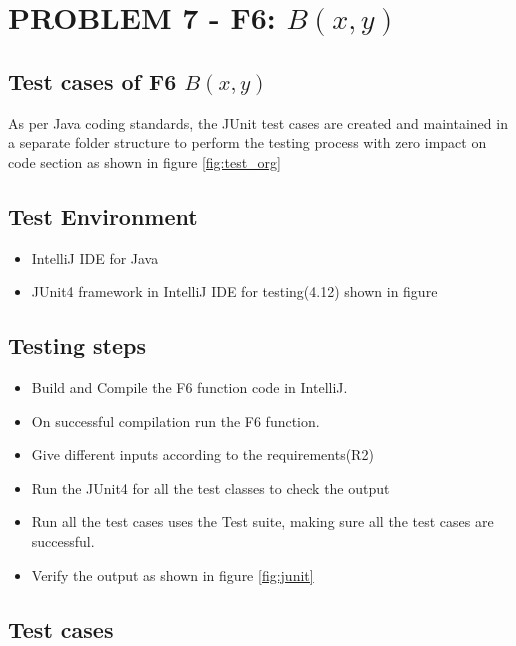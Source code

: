 \documentclass[letterpaper, 11pt]{article}
\begin{document}
\section{{PROBLEM 7 - F6: $B(x,y)$}}
    \subsection{Test cases of F6 $B(x,y)$}
    As per Java coding standards, the JUnit test cases are created and maintained in a separate folder structure to perform the testing process with zero impact on code section as shown in figure \ref{fig:test_org} \\
    \subsection{Test Environment}
        \begin{itemize}
            \item IntelliJ IDE for Java
            \item  JUnit4 framework in IntelliJ IDE for
            testing(4.12) shown in figure 
        \end{itemize}

    \subsection{Testing steps}
        \begin{itemize}
            \item Build and Compile the F6 function code in IntelliJ.
            \item On successful compilation run the F6 function.
            \item Give different inputs according to the requirements(R2)
            \item Run the JUnit4 for all the test classes to check the output
            \item Run all the test cases uses the Test suite, making sure all the test cases are successful.
            \item Verify the output as shown in figure \ref{fig:junit}
        \end{itemize}
    \subsection{Test cases}
\end{document}
